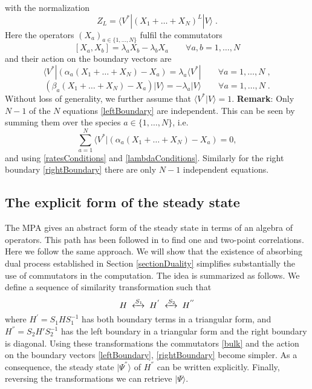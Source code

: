 \documentclass[10pt]{article}
\numberwithin{equation}{section}
\numberwithin{equation}{subsection}
\newcommand{\co}{\;,}
\newcommand{\dt}{\;.}
\begin{document}
with the normalization 
\begin{equation}
	Z_{L}=\langle V^{*}|(X_{1}+\ldots +X_{N})^{L}|V\rangle\dt
\end{equation}
Here the operators $(X_{a})_{a\in \{1,\ldots,N\}}$ fulfil the commutators
\begin{equation}\label{bulk}
	\left[X_{a},X_{b}\right]=\lambda_{a}X_{b}-\lambda_{b}X_{a}\qquad\forall a,b=1,\ldots,N
\end{equation}
and their action on the boundary vectors are
\begin{equation}\label{leftBoundary}
	\langle V^{*}|\left(\alpha_{a}(X_{1}+\ldots+X_{N})-X_{a}\right)=\lambda_{a}\langle V^{*}|\qquad\forall a=1,\ldots,N\co
\end{equation}
\begin{equation}\label{rightBoundary}
	\left(\beta_{a}(X_{1}+\ldots+X_{N})-X_{a}\right)|V\rangle=-\lambda_{a}|V\rangle\qquad\forall a=1,\ldots,N\dt
\end{equation}
Without loss of generality, we further assume that $\langle V^{*}|V\rangle=1$. 
\newline \newline
\textbf{Remark}: Only $N-1$ of the $N$ equations \eqref{leftBoundary}  are independent. This can be seen by summing them over the species $a\in \{1,\ldots,N\}$, i.e.
	\begin{equation}
		\sum_{a=1}^{N}	\langle V^{*}|\left(\alpha_{a}(X_{1}+\ldots+X_{N})-X_{a}\right)=0,%
	\end{equation}
	and using  \eqref{ratesConditions} and \eqref{lambdaConditions}.
 Similarly for the right boundary  \eqref{rightBoundary} there are only  $N-1$ independent equations.
\subsection{The explicit form of the steady state}\label{subsection-exact}
The MPA gives an abstract form of the steady state in terms of an algebra of operators. This path has been followed in \cite{vanicat2017exact} to find one and two-point correlations. 
Here we follow the same approach. We will show that the existence of absorbing dual process established in Section \ref{sectionDuality} simplifies substantially the  use of commutators in the
computation. The idea is summarized as follows. We define a sequence of similarity transformation such that 
\begin{equation}
	H\;\xleftrightarrow{S_{1}}\;H^{'}\;\xleftrightarrow{S_{2}}\;H^{''}
\end{equation} 
where $H^{'}= S_{1} H S_{1}^{-1} $ has both boundary terms in a triangular form, and $H^{''} = S_{2}H' S_{2}^{-1}$ has the left boundary in a triangular form and the right boundary is diagonal. Using these transformations the commutators \eqref{bulk} and the action on the boundary vectors \eqref{leftBoundary}, \eqref{rightBoundary} become simpler. As a consequence, the steady state $|\Psi^{''}\rangle$ of $H^{''}$ can be written explicitly. Finally, reversing the transformations we can retrieve $|\Psi\rangle$.
\end{document}
